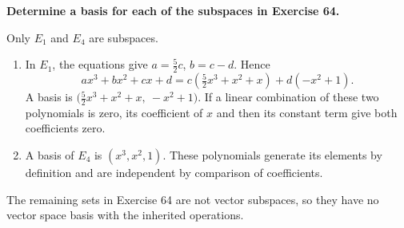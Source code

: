 \providecommand{\rank}{\operatorname{r}}
\providecommand{\RR}{\mathbb R}
\providecommand{\CC}{\mathbb C}
\providecommand{\KK}{\mathbb K}

\setcounter{enumi}{81}
\item {\bfseries\boldmath
Determine a basis for each of the subspaces in Exercise 64.
}

\begin{answer}
Only $E_1$ and $E_4$ are subspaces.
\begin{enumerate}
\item[$\mathbf{(a)}$] In $E_1$, the equations give $a=\frac52c$, $b=c-d$.
Hence
\[
 ax^3+bx^2+cx+d=c\left(\tfrac52x^3+x^2+x\right)+d(-x^2+1).
\]
A basis is $\bigl(\frac52x^3+x^2+x,\ -x^2+1\bigr)$.
If a linear combination of these two polynomials is zero, its coefficient of
$x$ and then its constant term give both coefficients zero.
\item[$\mathbf{(d)}$] A basis of $E_4$ is $(x^3,x^2,1)$.
These polynomials generate its elements by definition and are independent
by comparison of coefficients.
\end{enumerate}
The remaining sets in Exercise 64 are not vector subspaces, so they have no
vector space basis with the inherited operations.
\end{answer}

